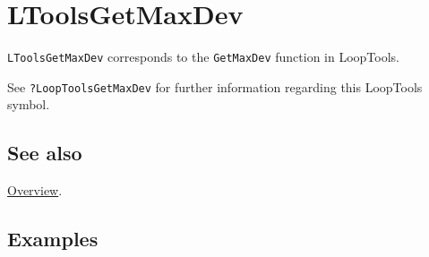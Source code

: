 \documentclass[../FeynHelpersManual.tex]{subfiles}
\begin{document}
\hypertarget{ltoolsgetmaxdev}{
\section{LToolsGetMaxDev}\label{ltoolsgetmaxdev}}

\texttt{LToolsGetMaxDev} corresponds to the \texttt{GetMaxDev} function
in LoopTools.

See \texttt{?LoopTools\textasciigrave GetMaxDev} for further information
regarding this LoopTools symbol.

\subsection{See also}

\hyperlink{toc}{Overview}.

\subsection{Examples}
\end{document}
